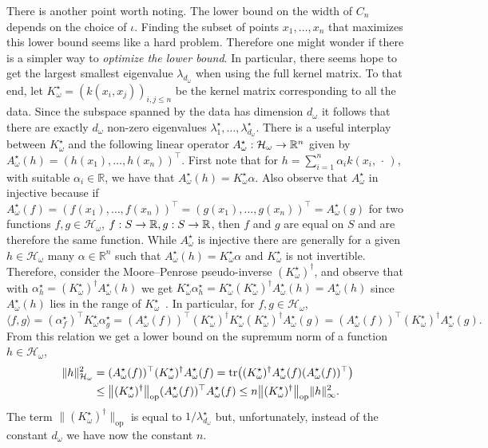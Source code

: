 \documentclass[AHL,Unicode,longabstracts,published]{cedram}
\theoremstyle{remark}
\DeclareMathOperator{\opp}{op}
\DeclareMathOperator{\tr}{tr}
\newcommand{\R}{\mathbb{R}}
\newcommand{\cH}{\mathcal{H}}
\newcommand*{\MK}{\mkern 2mu}
\renewcommand*{\to}{\mathchoice{\longrightarrow}{\rightarrow}{\rightarrow}{\rightarrow}}
\let\originalleft\left
\let\originalright\right
\renewcommand{\left}{\mathopen{}\mathclose\bgroup\originalleft}
\renewcommand{\right}{\aftergroup\egroup\originalright}
\begin{document}
There is another point worth noting. The lower bound on the width of $C_n$ depends on the choice of $\iota$. Finding the subset of points $x_1,\dots, x_n$ that maximizes this lower bound seems like a hard problem. Therefore one might wonder if there is a simpler way to \emph{optimize the lower bound}. In particular, there seems hope to get the largest smallest eigenvalue $\lambda_{d_\omega}$ when using the full kernel matrix. To that end, let $K^\star_\omega = (k(x_i,x_j))_{i,j \leq n}$ be the kernel matrix corresponding to all the data. Since the subspace spanned by the data has dimension $d_\omega$ it follows that there are exactly $d_\omega$ non-zero eigenvalues $\lambda_1^\star,\dots, \lambda^\star_{d_\omega}$. There is a useful interplay between $K_\omega^\star$ and the following linear operator $A_\omega^\star :\cH_\omega \to \R^n$ given by $A_\omega^\star(h) = (h(x_1),\dots, h(x_n))^\top$. First note that for $h= \sum_{i=1}^n \alpha_i k(x_i,\,\cdot\,)$, with suitable $\alpha_i \in \R$, we have that $A^\star_\omega(h) = K_\omega^\star \alpha$. Also observe that $A_\omega^\star$ in injective because if $A_\omega^\star(f) = (f(x_1), \dots, f(x_n))^\top = (g(x_1),\dots, g(x_n))^\top = A_\omega^\star(g)$ for two functions $f,g \in \cH_\omega$, $f: S\to \R, g:S \to \R$, then $f$ and $g$ are equal on $S$ and are therefore the same function. While $A_\omega^\star$ is injective there are generally for a given $h\in \cH_\omega$ many $\alpha \in \R^n$ such that $A_\omega^\star(h) = K_\omega^\star \alpha$ and $K_\omega^\star$ is not invertible. Therefore, consider the Moore--Penrose pseudo-inverse $(K_\omega^\star)^\dagger$, and observe that with $\alpha_h^\star = (K_\omega^\star)^\dagger A_\omega^\star(h)$ we get $K_\omega^\star \alpha_h^\star = K_\omega^\star (K_\omega^\star)^\dagger A_\omega^\star(h) = A_\omega^\star(h)$ since $A_\omega^\star(h)$ lies in the range of $K_\omega^\star$~\cite[Definition~1.1.2$\MK$(a)]{CAMP09}. In particular, for $f,g \in \cH_\omega$,
\[
\langle f,g \rangle = (\alpha^\star_f)^\top K_\omega^\star \alpha_g^\star = (A_\omega^\star(f))^\top (K_\omega^\star)^\dagger K_\omega^\star (K_\omega^\star)^\dagger A_\omega^\star(g) = (A_\omega^\star(f))^\top (K_\omega^\star)^\dagger A_\omega^\star(g).
\]
From this relation we get a lower bound on the supremum norm of a function $h
\in \cH_\omega$,
\begin{align*}
\|h\|_{\cH_\omega}^2 &= (A_\omega^\star(f))^\top (K_\omega^\star)^\dagger A_\omega^\star(f) = \tr\left((K_\omega^\star)^\dagger A_\omega^\star(f) (A_\omega^\star(f))^\top\right) \\
&\leq \left\| (K_\omega^\star)^\dagger\right\|_{\opp} (A_\omega^\star(f))^\top A_\omega^\star(f)
\leq n \left\| (K_\omega^\star)^\dagger\right\|_{\opp} \|h\|_\infty^2.
\end{align*}
The term $\|(K_\omega^\star)^\dagger\|_{\opp}$ is equal to $1/\lambda_{d_\omega}^\star$ but, unfortunately, instead of the constant $d_\omega$ we have now the constant $n$.
\end{document}

